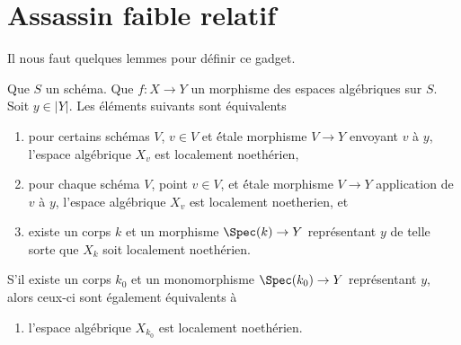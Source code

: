 \section{Assassin faible relatif}
\label{section-relative-weak-assassin}

\noindent
Il nous faut quelques lemmes pour définir ce gadget.

\begin{lemma}
\label{lemma-locally-noetherian-fibre}
Que $S$ un schéma. Que $f : X \to Y$ un morphisme des espaces algébriques
sur $S$. Soit $y \in |Y|$. Les éléments suivants sont équivalents
\begin{enumerate}
\item pour certains schémas $V$, $v \in V$ et \'étale morphisme $V \to Y$
envoyant $v$ à $y$, l'espace algébrique $X_v$ est localement noethérien,
\item pour chaque schéma $V$, point $v \in V$, et \'étale morphisme $V \to Y$
application de $v$ à $y$, l'espace algébrique $X_v$ est localement noetherien, et
\item existe un corps $k$ et un morphisme $\Spec(k) \to Y$ représentant
$y$ de telle sorte que $X_k$ soit localement noethérien.
\end{enumerate}
S'il existe un corps $k_0$ et un monomorphisme $\Spec(k_0) \to Y$
représentant $y$, alors ceux-ci sont également équivalents à
\begin{enumerate}
\item[(4)] l'espace algébrique $X_{k_0}$ est localement noethérien.
\end{enumerate}
\end{lemma}

